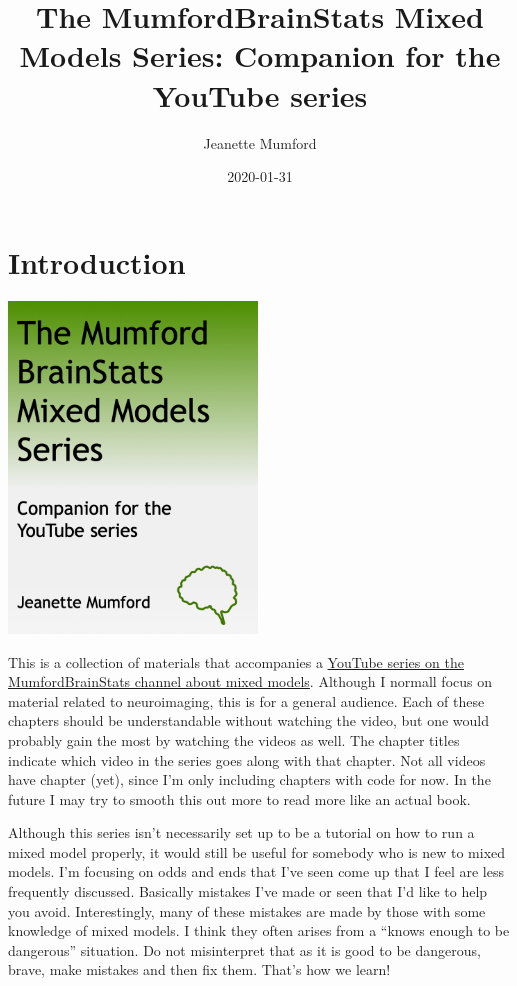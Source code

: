\documentclass[
]{book}
\title{The MumfordBrainStats Mixed Models Series: Companion for the YouTube series}
\author{Jeanette Mumford}
\date{2020-01-31}
\begin{document}
\maketitle

{
\setcounter{tocdepth}{1}
\tableofcontents
}
\hypertarget{introduction}{%
\chapter*{Introduction}\label{introduction}}

\includegraphics[width=250px]{./images/mixed_model_book_cover}

This is a collection of materials that accompanies a \href{https://www.youtube.com/watch?v=IGHm1XHFWMc\&list=PLB2iAtgpI4YEAUiEQ1ZnfMXY-yewNzn9z}{YouTube series on the MumfordBrainStats channel about mixed models}. Although I normall focus on material related to neuroimaging, this is for a general audience. Each of these chapters should be understandable without watching the video, but one would probably gain the most by watching the videos as well. The chapter titles indicate which video in the series goes along with that chapter. Not all videos have chapter (yet), since I'm only including chapters with code for now. In the future I may try to smooth this out more to read more like an actual book.

Although this series isn't necessarily set up to be a tutorial on how to run a mixed model properly, it would still be useful for somebody who is new to mixed models. I'm focusing on odds and ends that I've seen come up that I feel are less frequently discussed. Basically mistakes I've made or seen that I'd like to help you avoid. Interestingly, many of these mistakes are made by those with some knowledge of mixed models. I think they often arises from a ``knows enough to be dangerous'' situation. Do not misinterpret that as it is good to be dangerous, brave, make mistakes and then fix them. That's how we learn!
\end{document}
